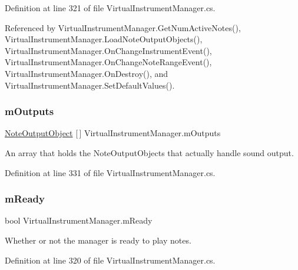Definition at line 321 of file Virtual\+Instrument\+Manager.\+cs.



Referenced by Virtual\+Instrument\+Manager.\+Get\+Num\+Active\+Notes(), Virtual\+Instrument\+Manager.\+Load\+Note\+Output\+Objects(), Virtual\+Instrument\+Manager.\+On\+Change\+Instrument\+Event(), Virtual\+Instrument\+Manager.\+On\+Change\+Note\+Range\+Event(), Virtual\+Instrument\+Manager.\+On\+Destroy(), and Virtual\+Instrument\+Manager.\+Set\+Default\+Values().

\mbox{\label{group___v_i_m_priv_ga53f837fd01475fa35629a650e7fa00e3}} 
\subsubsection{\texorpdfstring{m\+Outputs}{mOutputs}}
{\footnotesize\ttfamily \hyperlink{class_note_output_object}{Note\+Output\+Object} \mbox{[}$\,$\mbox{]} Virtual\+Instrument\+Manager.\+m\+Outputs\hspace{0.3cm}{\ttfamily [private]}}



An array that holds the Note\+Output\+Objects that actually handle sound output. 



Definition at line 331 of file Virtual\+Instrument\+Manager.\+cs.

\mbox{\label{group___v_i_m_priv_ga983a11920bf16794735cc193c327ac42}} 
\subsubsection{\texorpdfstring{m\+Ready}{mReady}}
{\footnotesize\ttfamily bool Virtual\+Instrument\+Manager.\+m\+Ready\hspace{0.3cm}{\ttfamily [private]}}



Whether or not the manager is ready to play notes. 



Definition at line 320 of file Virtual\+Instrument\+Manager.\+cs.

\mbox{\label{group___v_i_m_priv_gaa8d4f5642f5ac4dca4f4178b0052c78d}} 
